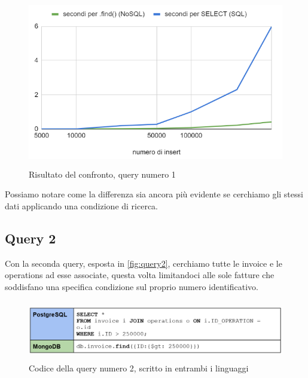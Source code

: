 \begin{figure}[htbp]
\begin{center}
\includegraphics[height=20em]{immagini/query/query1_results.png}
\caption{Risultato del confronto, query numero 1}
\label{fig:query1.2}
\end{center}
\end{figure}

\noindent Possiamo notare come la differenza sia ancora più evidente se cerchiamo gli stessi dati applicando una condizione di ricerca.\\


\subsection{Query 2}
Con la seconda query, esposta in \autoref{fig:query2}, cerchiamo tutte le invoice e le operations ad esse associate, questa volta limitandoci alle sole fatture che soddisfano una specifica condizione sul proprio numero identificativo.\\

\begin{figure}[htbp]
\begin{center}
\includegraphics[height=7em]{immagini/query/query2.png}
\caption{Codice della query numero 2, scritto in entrambi i linguaggi}
\label{fig:query2}
\end{center}
\end{figure}


